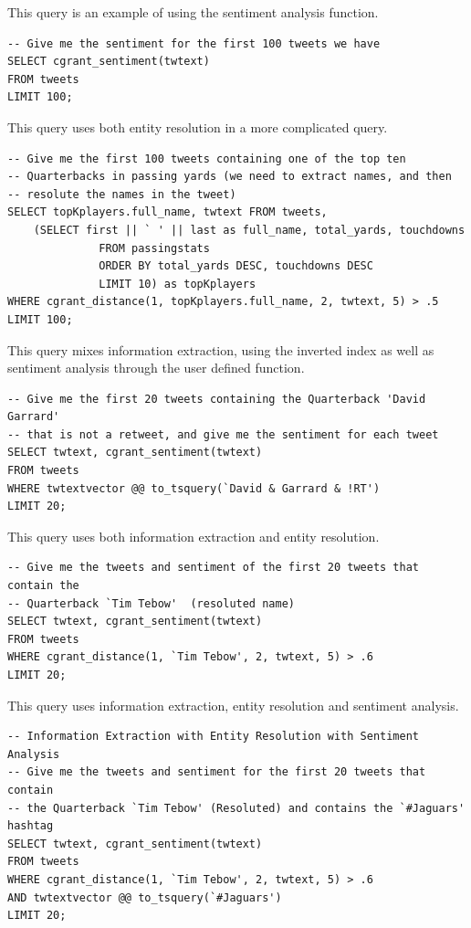 \documentclass[11pt,onecolumn]{article}
\begin{document}
This query is an example of using the sentiment analysis function.
\begin{verbatim}
-- Give me the sentiment for the first 100 tweets we have
SELECT cgrant_sentiment(twtext)
FROM tweets
LIMIT 100;
\end{verbatim}


This query uses both entity resolution in a more complicated query.
\begin{verbatim}
-- Give me the first 100 tweets containing one of the top ten 
-- Quarterbacks in passing yards (we need to extract names, and then 
-- resolute the names in the tweet)
SELECT topKplayers.full_name, twtext FROM tweets, 
	(SELECT first || ` ' || last as full_name, total_yards, touchdowns
              FROM passingstats
              ORDER BY total_yards DESC, touchdowns DESC
              LIMIT 10) as topKplayers
WHERE cgrant_distance(1, topKplayers.full_name, 2, twtext, 5) > .5
LIMIT 100;
\end{verbatim}


This query mixes information extraction, using the inverted index as well
as sentiment analysis through the user defined function.
\begin{verbatim}
-- Give me the first 20 tweets containing the Quarterback 'David Garrard' 
-- that is not a retweet, and give me the sentiment for each tweet
SELECT twtext, cgrant_sentiment(twtext)
FROM tweets
WHERE twtextvector @@ to_tsquery(`David & Garrard & !RT')
LIMIT 20;
\end{verbatim}

This query uses both information extraction and entity resolution.
\begin{verbatim}
-- Give me the tweets and sentiment of the first 20 tweets that contain the 
-- Quarterback `Tim Tebow'  (resoluted name)
SELECT twtext, cgrant_sentiment(twtext)
FROM tweets
WHERE cgrant_distance(1, `Tim Tebow', 2, twtext, 5) > .6
LIMIT 20;
\end{verbatim}

This query uses information extraction, entity resolution
and sentiment analysis.
\begin{verbatim}
-- Information Extraction with Entity Resolution with Sentiment Analysis
-- Give me the tweets and sentiment for the first 20 tweets that contain 
-- the Quarterback `Tim Tebow' (Resoluted) and contains the `#Jaguars' hashtag
SELECT twtext, cgrant_sentiment(twtext)
FROM tweets
WHERE cgrant_distance(1, `Tim Tebow', 2, twtext, 5) > .6 
AND twtextvector @@ to_tsquery(`#Jaguars')
LIMIT 20;
\end{verbatim}
\end{document}
